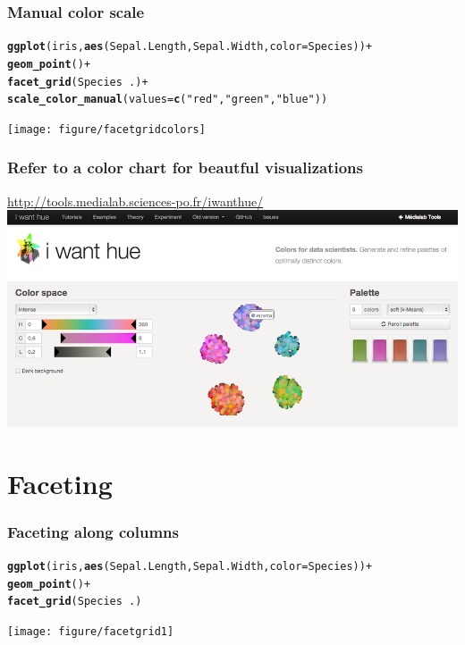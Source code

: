 \documentclass{beamer}\usepackage{graphicx, color}
\makeatletter
\newcommand{\hlfunctioncall}[1]{\textcolor[rgb]{0.501960784313725,0,0.329411764705882}{\textbf{#1}}}%
\newcommand{\hlstring}[1]{\textcolor[rgb]{0.6,0.6,1}{#1}}%
\newenvironment{kframe}{%
 \def\at@end@of@kframe{}%
 \ifinner\ifhmode%
  \def\at@end@of@kframe{\end{minipage}}%
  \begin{minipage}{\columnwidth}%
 \fi\fi%
 \def\FrameCommand##1{\hskip\@totalleftmargin \hskip-\fboxsep
 \colorbox{shadecolor}{##1}\hskip-\fboxsep
     \hskip-\linewidth \hskip-\@totalleftmargin \hskip\columnwidth}%
 \MakeFramed {\advance\hsize-\width
   \@totalleftmargin\z@ \linewidth\hsize
   \@setminipage}}%
 {\par\unskip\endMakeFramed%
 \at@end@of@kframe}
\newenvironment{knitrout}{}{} %
\makeatother
\begin{document}
\begin{frame}[fragile]
\frametitle{Manual color scale}
\begin{knitrout}\footnotesize
{}\color{fgcolor}\begin{kframe}
\begin{alltt}
\hlfunctioncall{ggplot}(iris, \hlfunctioncall{aes}(Sepal.Length, Sepal.Width, color = Species)) +
\hlfunctioncall{geom_point}() +
\hlfunctioncall{facet_grid}(Species ~ .) +
\hlfunctioncall{scale_color_manual}(values = \hlfunctioncall{c}(\hlstring{"red"}, \hlstring{"green"}, \hlstring{"blue"}))
\end{alltt}
\end{kframe}
\texttt{[image: figure/facetgridcolors]} 

\end{knitrout}

\end{frame}

\begin{frame}[fragile]
\frametitle{Refer to a color chart for beautful visualizations}
\url{http://tools.medialab.sciences-po.fr/iwanthue/}
\includegraphics[scale=0.25]{images/color_schemes.png}
\end{frame}


\section*{Faceting}
\frame{\sectionpage}

\begin{frame}[fragile]
\frametitle{Faceting along columns}
\begin{knitrout}\footnotesize
{}\color{fgcolor}\begin{kframe}
\begin{alltt}
\hlfunctioncall{ggplot}(iris, \hlfunctioncall{aes}(Sepal.Length, Sepal.Width, color = Species)) +
\hlfunctioncall{geom_point}() +
\hlfunctioncall{facet_grid}(Species ~ .)
\end{alltt}
\end{kframe}
\texttt{[image: figure/facetgrid1]} 

\end{knitrout}

\end{frame}
\end{document}

